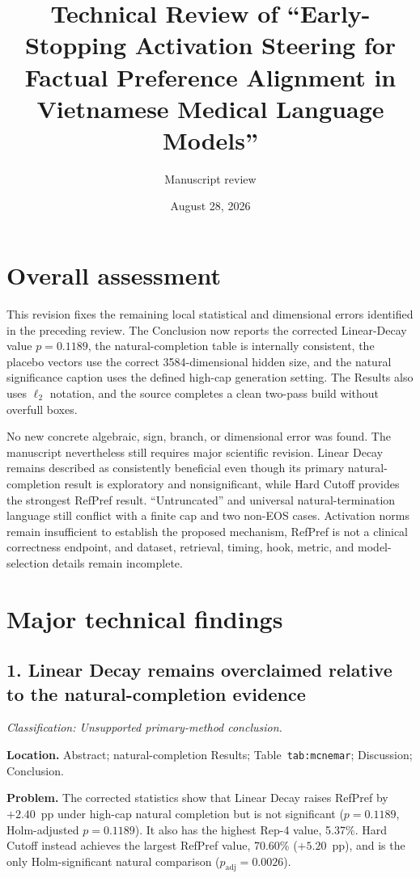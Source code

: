 \documentclass[11pt]{article}
\title{Technical Review of ``Early-Stopping Activation Steering for Factual Preference Alignment in Vietnamese Medical Language Models''}
\author{Manuscript review}
\date{August 28, 2026}
\newcommand{\findinglabel}[1]{\textbf{#1}}
\newcommand{\classification}[1]{\textit{Classification: #1.}}
\begin{document}
\maketitle

\section*{Overall assessment}

This revision fixes the remaining local statistical and dimensional errors identified in the preceding review.  The Conclusion now reports the corrected Linear-Decay value $p=0.1189$, the natural-completion table is internally consistent, the placebo vectors use the correct 3584-dimensional hidden size, and the natural significance caption uses the defined high-cap generation setting.  The Results also uses $\ell_2$ notation, and the source completes a clean two-pass build without overfull boxes.

No new concrete algebraic, sign, branch, or dimensional error was found.  The manuscript nevertheless still requires major scientific revision.  Linear Decay remains described as consistently beneficial even though its primary natural-completion result is exploratory and nonsignificant, while Hard Cutoff provides the strongest RefPref result.  ``Untruncated'' and universal natural-termination language still conflict with a finite cap and two non-EOS cases.  Activation norms remain insufficient to establish the proposed mechanism, RefPref is not a clinical correctness endpoint, and dataset, retrieval, timing, hook, metric, and model-selection details remain incomplete.

\section*{Major technical findings}

\subsection*{1. Linear Decay remains overclaimed relative to the natural-completion evidence}

\classification{Unsupported primary-method conclusion}

\findinglabel{Location.} Abstract; natural-completion Results; Table~\texttt{tab:mcnemar}; Discussion; Conclusion.

\findinglabel{Problem.} The corrected statistics show that Linear Decay raises RefPref by $+2.40$~pp under high-cap natural completion but is not significant ($p=0.1189$, Holm-adjusted $p=0.1189$).  It also has the highest Rep-4 value, 5.37\%.  Hard Cutoff instead achieves the largest RefPref value, 70.60\% ($+5.20$~pp), and is the only Holm-significant natural comparison ($p_{\text{adj}}=0.0026$).
\end{document}
